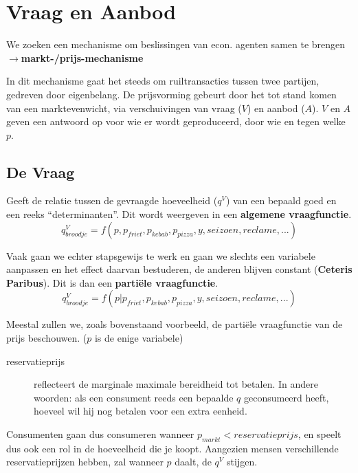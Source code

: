 \section{Vraag en Aanbod}
We zoeken een mechanisme om beslissingen van econ. agenten samen te brengen\\
$\rightarrow$\textbf{markt-/prijs-mechanisme}

In dit mechanisme gaat het steeds om ruiltransacties tussen twee partijen, gedreven door eigenbelang. De prijsvorming gebeurt door het tot stand komen van een marktevenwicht, via verschuivingen van vraag ($V$) en aanbod ($A$). $V$ en $A$ geven een antwoord op voor wie er wordt geproduceerd, door wie en tegen welke $p$.

\subsection{De Vraag}
Geeft de relatie tussen de gevraagde hoeveelheid ($q^V$) van een bepaald goed en een reeks ``determinanten''. Dit wordt weergeven in een \textbf{algemene vraagfunctie}.
\begin{equation}
	q^{V}_{broodje} = f(p,p_{friet},p_{kebab},p_{pizza},y,seizoen,reclame,...)
\end{equation}

Vaak gaan we echter stapsgewijs te werk en gaan we slechts een variabele aanpassen en het effect daarvan bestuderen, de anderen blijven constant (\textbf{Ceteris Paribus}). Dit is dan een \textbf{parti\"{e}le vraagfunctie}.
\begin{equation}
	q^{V}_{broodje} = f(p | p_{friet},p_{kebab},p_{pizza},y,seizoen,reclame,...)
\end{equation}

Meestal zullen we, zoals bovenstaand voorbeeld, de parti\"{e}le vraagfunctie van de prijs beschouwen. ($p$ is de enige variabele)

\begin{description}
	\item[reservatieprijs] reflecteert de marginale maximale bereidheid tot betalen. In andere woorden: als een consument reeds een bepaalde $q$ geconsumeerd heeft, hoeveel wil hij nog betalen voor een extra eenheid.
\end{description}

Consumenten gaan dus consumeren wanneer $p_{markt} < reservatieprijs$, en speelt dus ook een rol in de hoeveelheid die je koopt. Aangezien mensen verschillende reservatieprijzen hebben, zal wanneer $p$ daalt, de $q^V$ stijgen.


